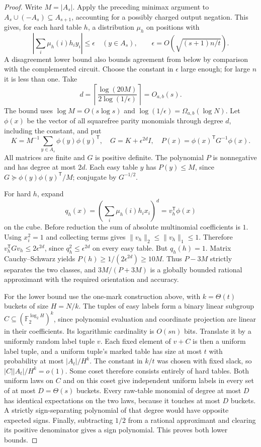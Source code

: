\begin{proof}
Write \(M=|A_s|\). Apply the preceding minimax argument to \(A_s\cup(-A_s)\subseteq A_{s+1}\), accounting for a possibly charged output negation. This gives, for each hard table \(h\), a distribution \(\mu_h\) on positions with
\[
  \left|\sum_i\mu_h(i)h_i y_i\right|\le\epsilon
       \quad(y\in A_s),\qquad \epsilon=O(\sqrt{(s+1)n/t}).
\]
A disagreement lower bound also bounds agreement from below by comparison with the complemented circuit. Choose the constant in \(\epsilon\) large enough; for large \(n\) it is less than one. Take
\[
 d=\left\lceil\frac{\log(20M)}{2\log(1/\epsilon)}\right\rceil=O_{a,b}(s).
\]
The bound uses \(\log M=O(s\log s)\) and \(\log(1/\epsilon)=\Omega_{a,b}(\log N)\). Let \(\phi(x)\) be the vector of all squarefree parity monomials through degree \(d\), including the constant, and put
\[
  K=M^{-1}\sum_{y\in A_s}\phi(y)\phi(y)^{\mathsf T},\quad
  G=K+\epsilon^{2d}I,\quad
  P(x)=\phi(x)^{\mathsf T}G^{-1}\phi(x).
\]
All matrices are finite and \(G\) is positive definite. The polynomial \(P\) is nonnegative and has degree at most \(2d\). Each easy table \(y\) has \(P(y)\le M\), since \(G\succeq\phi(y)\phi(y)^{\mathsf T}/M\); conjugate by \(G^{-1/2}\).

For hard \(h\), expand
\[
     q_h(x)=\left(\sum_i\mu_h(i)h_ix_i\right)^d
            =v_h^{\mathsf T}\phi(x)
\]
on the cube. Before reduction the sum of absolute multinomial coefficients is \(1\). Using \(x_i^2=1\) and collecting terms gives \(\|v_h\|_2\le\|v_h\|_1\le1\).
Therefore \(v_h^{\mathsf T}Gv_h\le 2\epsilon^{2d}\), since \(q_h^2\le\epsilon^{2d}\) on every easy table. But \(q_h(h)=1\). Matrix Cauchy--Schwarz yields
\(P(h)\ge 1/(2\epsilon^{2d})\ge10M\).
Thus \(P-3M\) strictly separates the two classes, and \(3M/(P+3M)\) is a globally bounded rational approximant with the required orientation and accuracy.

For the lower bound use the one-mark construction above, with \(k=\Theta(t)\) buckets of size \(H=N/k\). The tuples of easy labels form a binary linear subgroup \(C\subseteq(\mathbb F_2^{\log_2H})^k\), since polynomial evaluation and coordinate projection are linear in their coefficients. Its logarithmic cardinality is \(O(sn)\) bits. Translate it by a uniformly random label tuple \(v\). Each fixed element of \(v+C\) is then a uniform label tuple, and a uniform tuple's marked table has size at most \(t\) with probability at most \(|A_t|/H^k\). The constant in \(k/t\) was chosen with fixed slack, so \(|C||A_t|/H^k=o(1)\). Some coset therefore consists entirely of hard tables. Both uniform laws on \(C\) and on this coset give independent uniform labels in every set of at most \(D=\Theta(s)\) buckets. Every raw-table monomial of degree at most \(D\) has identical expectations on the two laws, because it touches at most \(D\) buckets. A strictly sign-separating polynomial of that degree would have opposite expected signs. Finally, subtracting \(1/2\) from a rational approximant and clearing its positive denominator gives a sign polynomial. This proves both lower bounds.
\end{proof}

